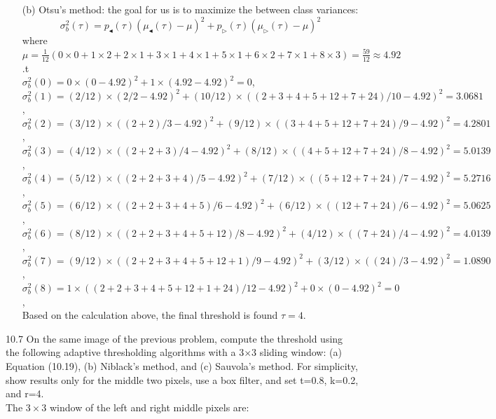 \documentclass[a4paper]{article}
\begin{document}
\begin{spacing}{2.0}
\begin{enumerate}
	\item[(b)] Otsu's method: the goal for us is to maximize the between class variances:
	$$\sigma_b^{2}(\tau) = p_{\blacktriangleleft}(\tau)(\mu_{\blacktriangleleft}(\tau)-\mu)^2+p_{\vartriangleright}(\tau)(\mu_{\vartriangleright}(\tau)-\mu)^2$$
	where $\mu = \displaystyle\frac{1}{12}(0\times 0+1\times 2+2\times 1+3\times 1+4\times 1+5\times 1+6\times 2+7\times 1+8\times 3) = \displaystyle\frac{59}{12}\approx 4.92$.t \\
	$\sigma_b^{2}(0) = 0\times(0-4.92)^2+1\times(4.92-4.92)^2 = 0$, \\
	$\sigma_b^{2}(1) = (2/12)\times(2/2-4.92)^2+(10/12)\times((2+3+4+5+12+7+24)/10-4.92)^2 = 3.0681$,\\
	$\sigma_b^{2}(2) = (3/12)\times((2+2)/3-4.92)^2+(9/12)\times((3+4+5+12+7+24)/9-4.92)^2 = 4.2801$, \\
	$\sigma_b^{2}(3) = (4/12)\times((2+2+3)/4-4.92)^2+(8/12)\times((4+5+12+7+24)/8-4.92)^2 = 5.0139$, \\
	$\sigma_b^{2}(4) = (5/12)\times((2+2+3+4)/5-4.92)^2+(7/12)\times((5+12+7+24)/7-4.92)^2 = 5.2716$, \\
	$\sigma_b^{2}(5) = (6/12)\times((2+2+3+4+5)/6-4.92)^2+(6/12)\times((12+7+24)/6-4.92)^2 = 5.0625$, \\
	$\sigma_b^{2}(6) = (8/12)\times((2+2+3+4+5+12)/8-4.92)^2+(4/12)\times((7+24)/4-4.92)^2 = 4.0139$, \\
	$\sigma_b^{2}(7) = (9/12)\times((2+2+3+4+5+12+1)/9-4.92)^2+(3/12)\times((24)/3-4.92)^2 = 1.0890$, \\
	$\sigma_b^{2}(8) = 1\times((2+2+3+4+5+12+1+24)/12-4.92)^2+0\times(0-4.92)^2 = 0$, \\
	Based on the calculation above, the final threshold is found $\tau = 4$.
	\end{enumerate}
	
	10.7 On the same image of the previous problem, compute the threshold using the following adaptive thresholding algorithms with a 3$\times$3 sliding window: (a) Equation (10.19), (b) Niblack's method, and (c) Sauvola's method. For simplicity, show results only for the middle two pixels, use a box filter, and set t=0.8, k=0.2, and r=4.\\
	The $3\times 3$ window of the left and right middle pixels are: 
	

\end{spacing}
\end{document}
